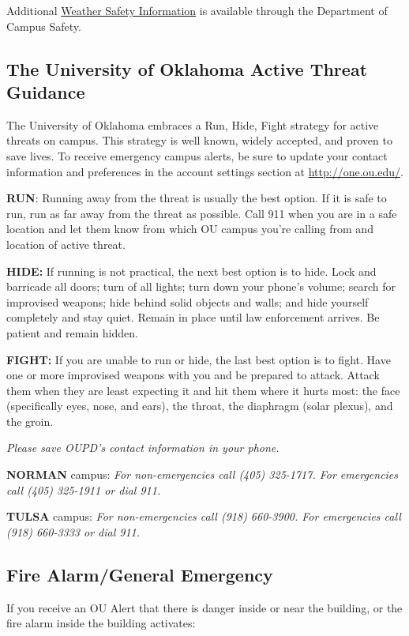 \documentclass[11pt,english]{article}
\begin{document}
Additional \href{https://www.ou.edu/campussafety/divisions#management}{Weather Safety Information} is available through the Department of Campus Safety.

\subsection*{The University of Oklahoma Active Threat Guidance}

The University of Oklahoma embraces a Run, Hide, Fight strategy for active threats on campus. This strategy is well known, widely accepted, and proven to save lives. To receive emergency campus alerts, be sure to update your contact information and preferences in the account settings section at \url{http://one.ou.edu/}.

\textbf{RUN}: Running away from the threat is usually the best option. If it is safe to run, run as far away from the threat as possible. Call 911 when you are in a safe location and let them know from which OU campus you're calling from and location of active threat.

\textbf{HIDE:} If running is not practical, the next best option is to hide. Lock and barricade all doors; turn of all lights; turn down your phone's volume; search for improvised weapons; hide behind solid objects and walls; and hide yourself completely and stay quiet. Remain in place until law enforcement arrives. Be patient and remain hidden.

\textbf{FIGHT:} If you are unable to run or hide, the last best option is to fight. Have one or more improvised weapons with you and be prepared to attack. Attack them when they are least expecting it and hit them where it hurts most: the face (specifically eyes, nose, and ears), the throat, the diaphragm (solar plexus), and the groin.

\textit{Please save OUPD's contact information in your phone.}

\textbf{NORMAN} campus: \textit{For non-emergencies call (405) 325-1717. For emergencies call (405) 325-1911 or dial 911.}

\textbf{TULSA} campus: \textit{For non-emergencies call (918) 660-3900. For emergencies call (918) 660-3333 or dial 911.}

\subsection*{Fire Alarm/General Emergency}

If you receive an OU Alert that there is danger inside or near the building, or the fire alarm inside the building activates:
\end{document}
